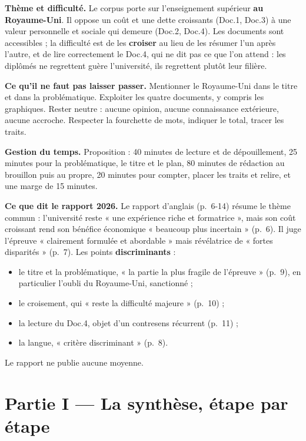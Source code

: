 \documentclass[11pt,a4paper]{article}
\providecommand{\tightlist}{\setlength{\itemsep}{0pt}\setlength{\parskip}{0pt}}
\begin{document}
\textbf{Thème et difficulté.} Le corpus porte sur l'enseignement supérieur \textbf{au Royaume-Uni}. Il oppose un coût et une dette croissants (Doc.1, Doc.3) à une valeur personnelle et sociale qui demeure (Doc.2, Doc.4). Les documents sont accessibles ; la difficulté est de les \textbf{croiser} au lieu de les résumer l'un après l'autre, et de lire correctement le Doc.4, qui ne dit pas ce que l'on attend : les diplômés ne regrettent guère l'université, ils regrettent plutôt leur filière.

\textbf{Ce qu'il ne faut pas laisser passer.} Mentionner le Royaume-Uni dans le titre et dans la problématique. Exploiter les quatre documents, y compris les graphiques. Rester neutre : aucune opinion, aucune connaissance extérieure, aucune accroche. Respecter la fourchette de mots, indiquer le total, tracer les traits.

\textbf{Gestion du temps.} Proposition : 40 minutes de lecture et de dépouillement, 25 minutes pour la problématique, le titre et le plan, 80 minutes de rédaction au brouillon puis au propre, 20 minutes pour compter, placer les traits et relire, et une marge de 15 minutes.

\textbf{Ce que dit le rapport 2026.} Le rapport d'anglais (p.~6-14) résume le thème commun : l'université reste « une expérience riche et formatrice », mais son coût croissant rend son bénéfice économique « beaucoup plus incertain » (p.~6). Il juge l'épreuve « clairement formulée et abordable » mais révélatrice de « fortes disparités » (p.~7). Les points \textbf{discriminants} :

\begin{itemize}
\tightlist
\item
  le titre et la problématique, « la partie la plus fragile de l'épreuve » (p.~9), en particulier l'oubli du Royaume-Uni, sanctionné ;
\item
  le croisement, qui « reste la difficulté majeure » (p.~10) ;
\item
  la lecture du Doc.4, objet d'un contresens récurrent (p.~11) ;
\item
  la langue, « critère discriminant » (p.~8).
\end{itemize}

Le rapport ne publie aucune moyenne.

\hypertarget{partie-i-la-synthuxe8se-uxe9tape-par-uxe9tape}{%
\section{Partie I --- La synthèse, étape par étape}\label{partie-i-la-synthuxe8se-uxe9tape-par-uxe9tape}}
\end{document}
